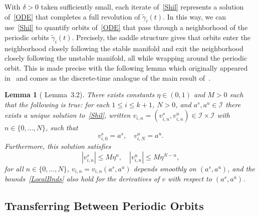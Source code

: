 \documentclass[11pt]{article}
\numberwithin{equation}{section}
\theoremstyle{plain}
\newtheorem{lem}[theorem]{Lemma}
\begin{document}
With $\delta > 0$ taken sufficiently small, each iterate of~\eqref{Shil} represents a solution of~\eqref{ODE} that completes a full revolution of $\tilde\gamma_i(t)$. In this way, we can use~\eqref{Shil} to quantify orbits of~\eqref{ODE} that pass through a neighborhood of the periodic orbits $\tilde\gamma_i(t)$. Precisely, the saddle structure gives that orbits enter the neighborhood closely following the stable manifold and exit the neighborhood closely following the unstable manifold, all while wrapping around the periodic orbit. This is made precise with the following lemma which originally appeared in~\cite{BramLDS} and comes as the discrete-time analogue of the main result of~\cite{Schecter}.   

\begin{lem}[\cite{BramLDS} Lemma~3.2] \label{lem:ShilSol} %
	There exists constants $\eta \in (0,1)$ and $M > 0$ such that the following is true: for each $1 \leq i \leq k+1$, $N > 0$, and $a^s,a^u \in \mathcal{I}$ there exists a unique solution to~\eqref{Shil}, written $v_{i,n} = (v^s_{i,n},v^u_{i,n}) \in \mathcal{I}\times\mathcal{I}$ with $n \in \{0,\dots,N\}$, such that
	\begin{equation}
		v_{i,0}^s = a^s, \quad v_{i,N}^u = a^u.
	\end{equation}
	Furthermore, this solution satisfies 
	\begin{equation}\label{LocalBnds}
		|v^s_{i,n}| \leq M\eta^n, \quad |v^u_{i,n}| \leq M\eta^{N-n},
	\end{equation}
	for all $n \in \{0,\dots,N\}$, $v_{i,n} = v_{i,n}(a^s,a^u)$ depends smoothly on $(a^s,a^u)$, and the bounds~\eqref{LocalBnds} also hold for the derivatives of $v$ with respect to $(a^s,a^u)$.
\end{lem}







\subsection{Transferring Between Periodic Orbits}\label{subsec:Transfer}
\end{document}
